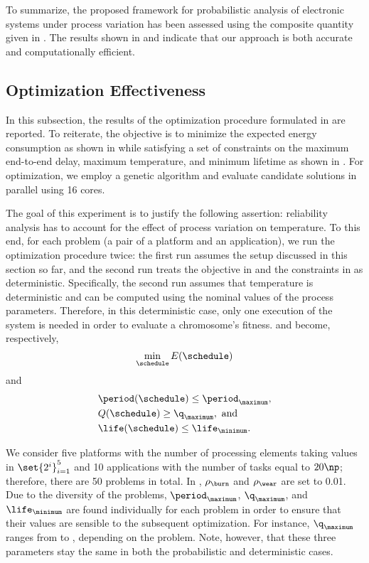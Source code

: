To summarize, the proposed framework for probabilistic analysis of electronic
systems under process variation has been assessed using the composite quantity
given in . The results shown in
 and  indicate
that our approach is both accurate and computationally efficient.

\subsection{Optimization Effectiveness}

In this subsection, the results of the optimization procedure formulated in
 are reported. To reiterate, the objective is to
minimize the expected energy consumption as shown in
 while satisfying a set of constraints on the
maximum end-to-end delay, maximum temperature, and minimum lifetime as shown in
. For optimization, we employ a genetic
algorithm and evaluate candidate solutions in parallel using 16 cores.

The goal of this experiment is to justify the following assertion: reliability
analysis has to account for the effect of process variation on temperature. To
this end, for each problem (a pair of a platform and an application), we run the
optimization procedure twice: the first run assumes the setup discussed in this
section so far, and the second run treats the objective in
 and the constraints in
 as deterministic. Specifically, the second
run assumes that temperature is deterministic and can be computed using the
nominal values of the process parameters. Therefore, in this deterministic case,
only one execution of the system is needed in order to evaluate a chromosome's
fitness.  and
 become, respectively,
\[
    \min_{\schedule} E(\schedule)
\]
and
\begin{align*}
  & \period(\schedule) \leq \period_\maximum, \\
  & Q(\schedule) \geq \q_\maximum, \text{ and} \\
  & \life(\schedule) \leq \life_\minimum.
\end{align*}

We consider five platforms with the number of processing elements \np taking
values in $\set{2^i}_{i = 1}^5$ and 10 applications with the number of tasks \nt
equal to $20 \np$; therefore, there are 50 problems in total. In
, $\rho_\burn$ and $\rho_\wear$ are set to
0.01. Due to the diversity of the problems, $\period_\maximum$, $\q_\maximum$,
and $\life_\minimum$ are found individually for each problem in order to ensure
that their values are sensible to the subsequent optimization. For instance,
$\q_\maximum$ ranges from  to , depending on the
problem. Note, however, that these three parameters stay the same in both the
probabilistic and deterministic cases.

